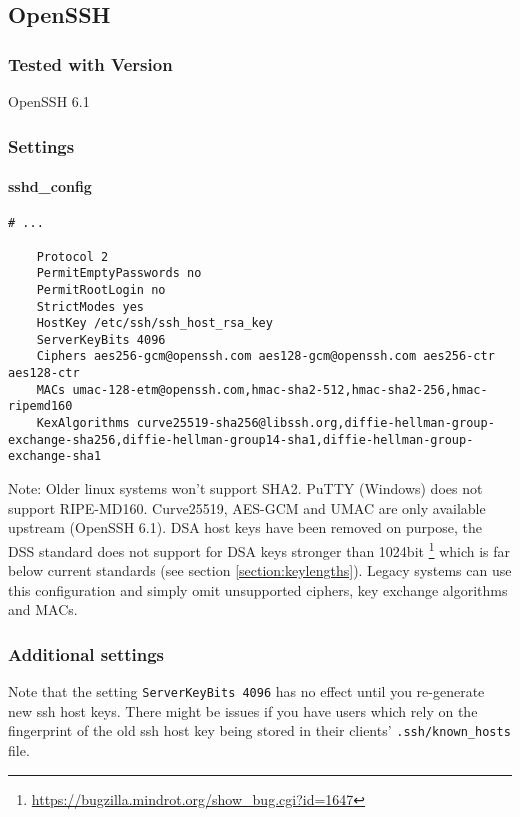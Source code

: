 \subsection{OpenSSH}
\subsubsection{Tested with Version} OpenSSH 6.1
\subsubsection{Settings}
\paragraph*{sshd_config}
\begin{lstlisting}[breaklines]
	# ...

	Protocol 2
	PermitEmptyPasswords no
	PermitRootLogin no
	StrictModes yes
	HostKey /etc/ssh/ssh_host_rsa_key
	ServerKeyBits 4096
	Ciphers aes256-gcm@openssh.com aes128-gcm@openssh.com aes256-ctr aes128-ctr
	MACs umac-128-etm@openssh.com,hmac-sha2-512,hmac-sha2-256,hmac-ripemd160
	KexAlgorithms curve25519-sha256@libssh.org,diffie-hellman-group-exchange-sha256,diffie-hellman-group14-sha1,diffie-hellman-group-exchange-sha1
\end{lstlisting}

Note: Older linux systems won't support SHA2. PuTTY (Windows) does not support
RIPE-MD160. Curve25519, AES-GCM and UMAC are only available upstream (OpenSSH
6.1). DSA host keys have been removed on purpose, the DSS standard does not
support for DSA keys stronger than 1024bit
\footnote{\url{https://bugzilla.mindrot.org/show_bug.cgi?id=1647}} which is far
below current standards (see section \ref{section:keylengths}). Legacy systems
can use this configuration and simply omit unsupported ciphers, key exchange
algorithms and MACs.  
\subsubsection{Additional settings}
Note that the setting \texttt{ServerKeyBits 4096}  has no effect until you re-generate new ssh host keys. There might be issues if you have users which rely on the fingerprint of the old ssh host key being stored in their clients' \texttt{.ssh/known\_hosts} file.
